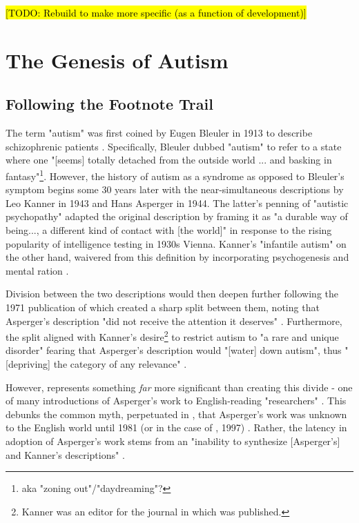 \documentclass[letterpaper]{article}
\begin{document}
\hl{[TODO: Rebuild to make more specific (as a function of development)]}

\section{The Genesis of Autism} \label{sec:gen}
\subsection{Following the Footnote Trail}
The term "autism" was first coined by Eugen Bleuler in 1913 to describe schizophrenic patients \cite[p.~213]{eyal}. Specifically, Bleuler dubbed "autism" to refer to a state where one "[seems] totally detached from the outside world ... and basking in fantasy"\cite[p.~213]{eyal}\footnote{aka "zoning out"/"daydreaming"?}. However, the history of autism as a syndrome as opposed to Bleuler's symptom begins some 30 years later with the near-simultaneous descriptions by Leo Kanner in 1943 and Hans Asperger in 1944. The latter's penning of "autistic psychopathy" adapted the original description by framing it as "a durable way of being..., a different kind of contact with [the world]"\cite[p.~213]{eyal} in response to the rising popularity of intelligence testing in 1930s Vienna. Kanner's "infantile autism" on the other hand, waivered from this definition by incorporating psychogenesis and mental ration \cite[p.~215]{eyal}.

Division between the two descriptions would then deepen further following the 1971 publication of \cite{vk} which created a sharp split between them, noting that Asperger's description "did not receive the attention it deserves" \cite{vk}. Furthermore, the split aligned with Kanner's desire\footnote{Kanner was an editor for the journal in which \cite{vk} was published.} to restrict autism to "a rare and unique disorder" fearing that Asperger's description would "[water] down autism", thus "[depriving] the category of any relevance" \cite[p.~216]{eyal}.


However, \cite{vk} represents something \textit{far} more significant than creating this divide - one of many introductions of Asperger's work to English-reading "researchers" \cite[pp.~216-7]{eyal}. This debunks the common myth, perpetuated in \cite{diff}, that Asperger's work was unknown to the English world until 1981 (or in the case of \cite{diff}, 1997) \cite[p.~216]{eyal}. Rather, the latency in adoption of Asperger's work stems from an "inability to synthesize [Asperger's] and Kanner's descriptions" \cite[p.~222]{eyal}. 
\end{document}
